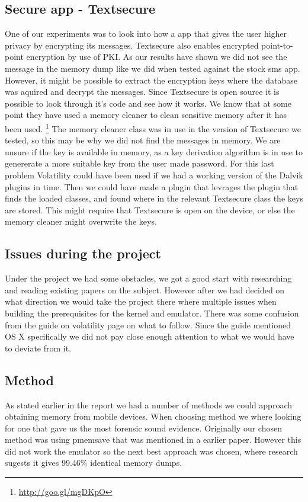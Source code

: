 \subsection{Secure app - Textsecure}
One of our experiments was to look into how a app that gives the user higher 
privacy by encrypting its messages. Textsecure also enables encrypted point-to-
point encryption by use of PKI. As our results have shown we did not see the 
message in the memory dump like we did when tested against the stock sms app. 
However, it might be possible to extract the encryption keys where the database was 
aquired and decrypt the messages. Since Textsecure is open source it is
possible to look through it's code and see how it works. We know that at some
point they have used a memory cleaner to clean sensitive memory after it has
been used.
\footnote{\url{http://goo.gl/mgDKpO}} 
The memory cleaner class was in use in the version of Textsecure we tested, so
this may be why we did not find the messages in memory. We are unsure if the
key is available in memory, as a key derivation algorithm is in use to
genererate a more suitable key from the user made password. For this last
problem Volatility could have been used if we had a working version of the
Dalvik plugins in time. Then we could have made a plugin that levrages the
plugin that finds the loaded classes, and found where in the relevant
Textsecure class the keys are stored. This might require that Textsecure is
open on the device, or else the memory cleaner might overwrite the keys.

\subsection{Issues during the project}
Under the project we had some obstacles, we got a good start with researching and 
reading existing papers on the subject. However after we had decided on what 
direction we would take the project there where multiple issues when building the 
prerequisites for the kernel and emulator. There was some confusion from the guide 
on volatility page on what to follow. Since the guide mentioned OS X specifically 
we did not pay close enough attention to what we would have to deviate from it.

\subsection{Method}
As stated earlier in the report we had a number of methods we could approach 
obtaining memory from mobile devices. When choosing method we where looking for one 
that gave us the most forensic sound evidence. Originally our chosen method was 
using pmemsave %
that was mentioned in a earlier paper\cite{acq_vol_android_mem}. However this did 
not work the emulator so the next best approach was chosen, where research sugests 
it gives 99.46\% identical memory dumps\cite{acq_vol_android_mem}.

